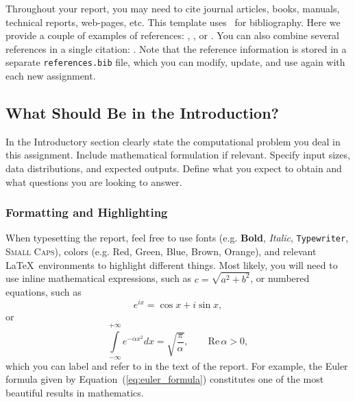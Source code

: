 \documentclass[11pt,a4paper]{article}
\begin{document}
Throughout your report, you may need to cite journal articles, books, manuals, technical reports, web-pages, etc. This template uses ~for bibliography. Here we provide a couple of examples of references: \cite{rauber_course_textbook}, \cite{cuda_guide}, or \cite{golub_t_21_215_1979}. You can also combine several references in a single citation: \cite{rauber_course_textbook,cuda_guide,golub_t_21_215_1979}. Note that the reference information
is stored in a separate \texttt{references.bib} file, which you can modify, update, and use again with each new assignment.

\subsection{What Should Be in the Introduction?\label{subsec:intr_content}}

In the Introductory section clearly state the computational problem you deal in this assignment. Include mathematical formulation if relevant. Specify input sizes, data distributions, and expected outputs. Define what you expect to obtain and what questions you are looking to answer.

\subsubsection{Formatting and Highlighting\label{subsubsec:highlighting}}

When typesetting the report, feel free to use fonts (e.g. \textbf{Bold}, \textit{Italic}, \texttt{Typewriter}, \textsc{Small Caps}), colors (e.g. {\color{red}Red}, {\color{green} Green}, {\color{blue} Blue}, {\color{brown} Brown}, {\color{orange} Orange}), and relevant \LaTeX~environments to highlight different things. Most likely, you will need to use inline mathematical expressions, such as $c=\sqrt{a^2+b^2}$, or numbered equations, such as
\begin{equation}\label{eq:euler_formula}
e^{i x} = \cos x + i \sin x ,  
\end{equation}
or
\begin{equation}\label{eq:gaussian_integral}
\int\limits_{-\infty}^{+\infty} e^{- \alpha x^2} dx = \sqrt{\frac{\pi}{\alpha}},
\qquad
\mathrm{Re} \, \alpha > 0,
\end{equation}
which you can label and refer to in the text of the report. For example, the Euler formula given by Equation~(\ref{eq:euler_formula}) constitutes one of the most beautiful results in mathematics.  
\end{document}
